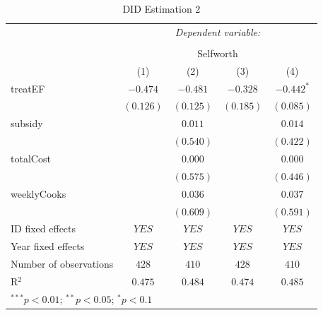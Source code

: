 \documentclass[12pt, a4paper, titlepage]{article}\usepackage[]{graphicx}\usepackage[]{color}
\begin{document}
\begin{table}
\begin{center}
\begin{tabular}{l c c c c}
& \multicolumn{4}{c}{\textit{Dependent variable:}} \\
\cline{2-5}
\\[-1.8ex] & \multicolumn{4}{c}{Selfworth} \\
\hline
 & (1) & (2) & (3) & (4) \\
\hline
treatEF                & $-0.474$  & $-0.481$  & $-0.328$  & $-0.442^{*}$ \\
                       & $(0.126)$ & $(0.125)$ & $(0.185)$ & $(0.085)$    \\
subsidy                &           & $0.011$   &           & $0.014$      \\
                       &           & $(0.540)$ &           & $(0.422)$    \\
totalCost              &           & $0.000$   &           & $0.000$      \\
                       &           & $(0.575)$ &           & $(0.446)$    \\
weeklyCooks            &           & $0.036$   &           & $0.037$      \\
                       &           & $(0.609)$ &           & $(0.591)$    \\
\hline
ID fixed effects       & $YES$     & $YES$     & $YES$     & $YES$        \\
Year fixed effects     & $YES$     & $YES$     & $YES$     & $YES$        \\
Number of observations & $428$     & $410$     & $428$     & $410$        \\
R$^2$                  & $0.475$   & $0.484$   & $0.474$   & $0.485$      \\
\hline
\multicolumn{5}{l}{\scriptsize{$^{***}p<0.01$; $^{**}p<0.05$; $^{*}p<0.1$}}
\end{tabular}
\caption{DID Estimation 2}
\label{table:coefficients4}
\end{center}
\end{table}
\end{document}
